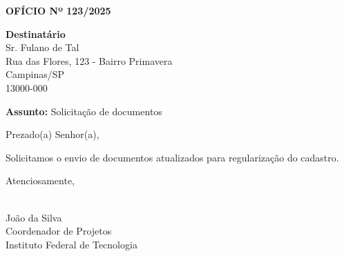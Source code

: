 \documentclass[a4paper,12pt]{article}
\begin{document}
\begin{center}
    \textbf{OFÍCIO Nº 123/2025}
\end{center}

\vspace{1cm}

\begin{flushright}
    \textbf{Destinatário} \\
    Sr. Fulano de Tal \\
    Rua das Flores, 123 - Bairro Primavera \\
    Campinas/SP \\
    13000-000
\end{flushright}

\vspace{1cm}

\textbf{Assunto:} Solicitação de documentos

\vspace{1cm}

Prezado(a) Senhor(a),

\bigskip

Solicitamos o envio de documentos atualizados para regularização do cadastro.

\bigskip

Atenciosamente,

\vspace{1cm}

\hrulefill \\
João da Silva \\
Coordenador de Projetos \\
Instituto Federal de Tecnologia \\
\end{document}
